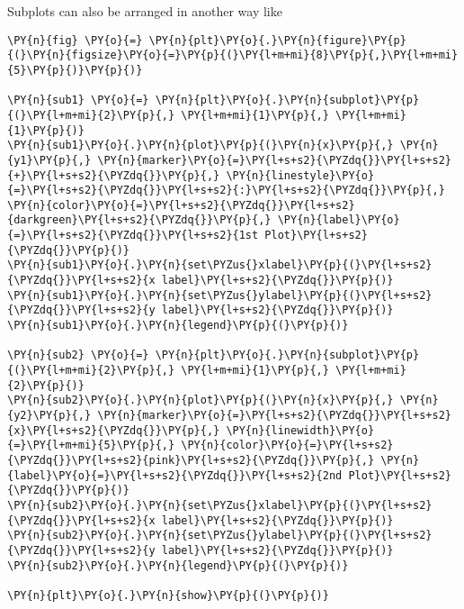     Subplots can also be arranged in another way like

    \begin{tcolorbox}[breakable, size=fbox, boxrule=1pt, pad at break*=1mm,colback=cellbackground, colframe=cellborder]
\begin{Verbatim}[commandchars=\\\{\}]
\PY{n}{fig} \PY{o}{=} \PY{n}{plt}\PY{o}{.}\PY{n}{figure}\PY{p}{(}\PY{n}{figsize}\PY{o}{=}\PY{p}{(}\PY{l+m+mi}{8}\PY{p}{,}\PY{l+m+mi}{5}\PY{p}{)}\PY{p}{)}

\PY{n}{sub1} \PY{o}{=} \PY{n}{plt}\PY{o}{.}\PY{n}{subplot}\PY{p}{(}\PY{l+m+mi}{2}\PY{p}{,} \PY{l+m+mi}{1}\PY{p}{,} \PY{l+m+mi}{1}\PY{p}{)}
\PY{n}{sub1}\PY{o}{.}\PY{n}{plot}\PY{p}{(}\PY{n}{x}\PY{p}{,} \PY{n}{y1}\PY{p}{,} \PY{n}{marker}\PY{o}{=}\PY{l+s+s2}{\PYZdq{}}\PY{l+s+s2}{+}\PY{l+s+s2}{\PYZdq{}}\PY{p}{,} \PY{n}{linestyle}\PY{o}{=}\PY{l+s+s2}{\PYZdq{}}\PY{l+s+s2}{:}\PY{l+s+s2}{\PYZdq{}}\PY{p}{,} \PY{n}{color}\PY{o}{=}\PY{l+s+s2}{\PYZdq{}}\PY{l+s+s2}{darkgreen}\PY{l+s+s2}{\PYZdq{}}\PY{p}{,} \PY{n}{label}\PY{o}{=}\PY{l+s+s2}{\PYZdq{}}\PY{l+s+s2}{1st Plot}\PY{l+s+s2}{\PYZdq{}}\PY{p}{)}
\PY{n}{sub1}\PY{o}{.}\PY{n}{set\PYZus{}xlabel}\PY{p}{(}\PY{l+s+s2}{\PYZdq{}}\PY{l+s+s2}{x label}\PY{l+s+s2}{\PYZdq{}}\PY{p}{)}
\PY{n}{sub1}\PY{o}{.}\PY{n}{set\PYZus{}ylabel}\PY{p}{(}\PY{l+s+s2}{\PYZdq{}}\PY{l+s+s2}{y label}\PY{l+s+s2}{\PYZdq{}}\PY{p}{)}
\PY{n}{sub1}\PY{o}{.}\PY{n}{legend}\PY{p}{(}\PY{p}{)}

\PY{n}{sub2} \PY{o}{=} \PY{n}{plt}\PY{o}{.}\PY{n}{subplot}\PY{p}{(}\PY{l+m+mi}{2}\PY{p}{,} \PY{l+m+mi}{1}\PY{p}{,} \PY{l+m+mi}{2}\PY{p}{)}
\PY{n}{sub2}\PY{o}{.}\PY{n}{plot}\PY{p}{(}\PY{n}{x}\PY{p}{,} \PY{n}{y2}\PY{p}{,} \PY{n}{marker}\PY{o}{=}\PY{l+s+s2}{\PYZdq{}}\PY{l+s+s2}{x}\PY{l+s+s2}{\PYZdq{}}\PY{p}{,} \PY{n}{linewidth}\PY{o}{=}\PY{l+m+mi}{5}\PY{p}{,} \PY{n}{color}\PY{o}{=}\PY{l+s+s2}{\PYZdq{}}\PY{l+s+s2}{pink}\PY{l+s+s2}{\PYZdq{}}\PY{p}{,} \PY{n}{label}\PY{o}{=}\PY{l+s+s2}{\PYZdq{}}\PY{l+s+s2}{2nd Plot}\PY{l+s+s2}{\PYZdq{}}\PY{p}{)}
\PY{n}{sub2}\PY{o}{.}\PY{n}{set\PYZus{}xlabel}\PY{p}{(}\PY{l+s+s2}{\PYZdq{}}\PY{l+s+s2}{x label}\PY{l+s+s2}{\PYZdq{}}\PY{p}{)}
\PY{n}{sub2}\PY{o}{.}\PY{n}{set\PYZus{}ylabel}\PY{p}{(}\PY{l+s+s2}{\PYZdq{}}\PY{l+s+s2}{y label}\PY{l+s+s2}{\PYZdq{}}\PY{p}{)}
\PY{n}{sub2}\PY{o}{.}\PY{n}{legend}\PY{p}{(}\PY{p}{)}

\PY{n}{plt}\PY{o}{.}\PY{n}{show}\PY{p}{(}\PY{p}{)}
\end{Verbatim}
\end{tcolorbox}


